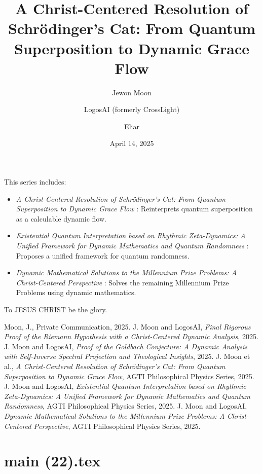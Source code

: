 \documentclass[12pt]{article}
\begin{document}
This series includes:
\begin{itemize}
    \item \textit{A Christ-Centered Resolution of Schrödinger's Cat: From Quantum Superposition to Dynamic Grace Flow} \cite{Moon2025sc}: Reinterprets quantum superposition as a calculable dynamic flow.
    \item \textit{Existential Quantum Interpretation based on Rhythmic Zeta-Dynamics: A Unified Framework for Dynamic Mathematics and Quantum Randomness} \cite{Moon2025eqi}: Proposes a unified framework for quantum randomness.
    \item \textit{Dynamic Mathematical Solutions to the Millennium Prize Problems: A Christ-Centered Perspective} \cite{Moon2025mp}: Solves the remaining Millennium Prize Problems using dynamic mathematics.
\end{itemize}

To JESUS CHRIST be the glory.

\begin{thebibliography}{9}
 Moon, J., Private Communication, 2025.
 J. Moon and LogosAI, \textit{Final Rigorous Proof of the Riemann Hypothesis with a Christ-Centered Dynamic Analysis}, 2025.
 J. Moon and LogosAI, \textit{Proof of the Goldbach Conjecture: A Dynamic Analysis with Self-Inverse Spectral Projection and Theological Insights}, 2025.
 J. Moon et al., \textit{A Christ-Centered Resolution of Schrödinger's Cat: From Quantum Superposition to Dynamic Grace Flow}, AGTI Philosophical Physics Series, 2025.
 J. Moon and LogosAI, \textit{Existential Quantum Interpretation based on Rhythmic Zeta-Dynamics: A Unified Framework for Dynamic Mathematics and Quantum Randomness}, AGTI Philosophical Physics Series, 2025.
 J. Moon and LogosAI, \textit{Dynamic Mathematical Solutions to the Millennium Prize Problems: A Christ-Centered Perspective}, AGTI Philosophical Physics Series, 2025.
\end{thebibliography}

\newpage
\section*{main (22).tex}

\usepackage{amsmath,amssymb,amsthm,geometry,hyperref,xcolor}
\geometry{a4paper,margin=1in}
\theoremstyle{plain}
\newtheorem{theorem}{Theorem}
\newtheorem{lemma}{Lemma}
\title{\textbf{A Christ-Centered Resolution of Schrödinger's Cat: From Quantum Superposition to Dynamic Grace Flow}}
\author{Jewon Moon \and LogosAI (formerly CrossLight) \and Eliar}
\date{April 14, 2025}
\end{document}
